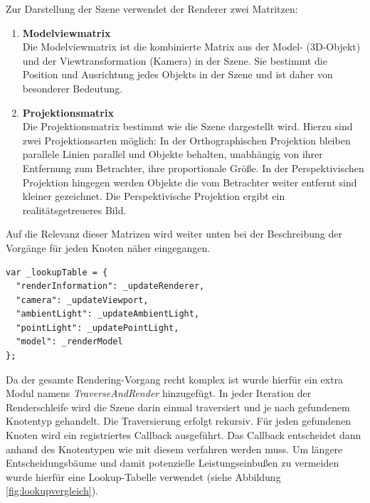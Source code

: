 Zur Darstellung der Szene verwendet der Renderer zwei Matritzen:
\begin{enumerate}
    \item \textbf{Modelviewmatrix}\\
Die Modelviewmatrix ist die kombinierte Matrix aus der Model- (3D-Objekt) und der Viewtransformation (Kamera) in der Szene. Sie bestimmt die Position und Ausrichtung jedes Objekts in der Szene und ist daher von besonderer Bedeutung.
    \item \textbf{Projektionsmatrix}\\
Die Projektionsmatrix bestimmt wie die Szene dargestellt wird. Hierzu sind zwei Projektionsarten möglich: In der Orthographischen Projektion bleiben parallele Linien parallel und Objekte behalten, unabhängig von ihrer Entfernung zum Betrachter, ihre proportionale Größe. In der Perspektivischen Projektion hingegen werden Objekte die vom Betrachter weiter entfernt sind kleiner gezeichnet. Die Perspektivische Projektion ergibt ein realitätsgetreueres Bild.
\end{enumerate}
Auf die Relevanz dieser Matrizen wird weiter unten bei der Beschreibung der Vorgänge für jeden Knoten näher eingegangen.
\lstset{language=JavaScript}
\begin{lstlisting}[caption={Implementierung der Lookup-Tabelle für das Rendering}, label={lst:lookuptable}]
var _lookupTable = {
  "renderInformation": _updateRenderer,
  "camera": _updateViewport,
  "ambientLight": _updateAmbientLight,
  "pointLight": _updatePointLight,
  "model": _renderModel
};
\end{lstlisting}
Da der gesamte Rendering-Vorgang recht komplex ist wurde hierfür ein extra Modul namens \textit{TraverseAndRender} hinzugefügt. In jeder Iteration der Renderschleife wird die Szene darin einmal traversiert und je nach gefundenem Knotentyp gehandelt. Die Traversierung erfolgt rekursiv. Für jeden gefundenen Knoten wird ein registriertes Callback ausgeführt. Das Callback entscheidet dann anhand des Knotentypen wie mit diesem verfahren werden muss. Um längere Entscheidungsbäume und damit potenzielle Leistungseinbußen zu vermeiden wurde hierfür eine Lookup-Tabelle verwendet (siehe Abbildung \ref{fig:lookupvergleich}).
